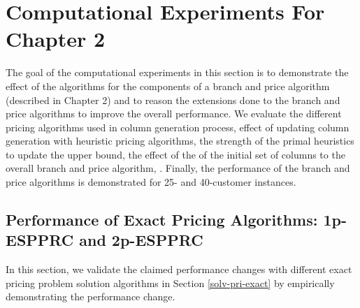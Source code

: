 \section{Computational Experiments For Chapter 2}
The goal of the computational experiments in this section
is to demonstrate the effect of the algorithms for the components of a branch and price
algorithm  (described in Chapter 2) and to reason the extensions done to the branch and price
algorithms to improve the overall performance. We evaluate the different pricing algorithms
used in column generation process, effect of updating column generation with heuristic
pricing algorithms, the strength of the primal heuristics to update the upper bound, the
effect of the of the initial set of columns to the overall branch and price algorithm,
.
Finally, the performance of the branch and price algorithms is demonstrated for
25- and 40-customer instances.

\subsection{Performance of Exact Pricing Algorithms: 1p-ESPPRC and 2p-ESPPRC}
In this section, we validate the claimed performance changes with different exact
pricing problem solution algorithms in Section \ref{solv-pri-exact}
by empirically demonstrating the performance change.

